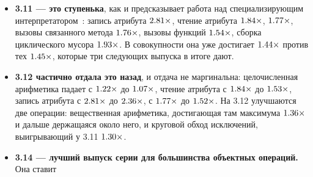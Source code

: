 \begin{itemize}[leftmargin=1.4em,itemsep=1pt]
  \item \textbf{3.11 --- это ступенька}, как и предсказывает работа над специализирующим
        интерпретатором~\cite{pep659}: запись атрибута $\meas{ratio:b3_runtime-v310:attr_set/v310|b3_runtime-v311:attr_set/v311}{2.81}\times$, чтение атрибута $\meas{ratio:b3_runtime-v310:attr_get/v310|b3_runtime-v311:attr_get/v311}{1.84}\times$,
         $\meas{ratio:b3_runtime-v310:list_append/v310|b3_runtime-v311:list_append/v311}{1.77}\times$, вызовы связанного метода $\meas{ratio:b3_runtime-v310:method_call/v310|b3_runtime-v311:method_call/v311}{1.76}\times$, вызовы функций
        $\meas{ratio:b3_runtime-v310:func_call/v310|b3_runtime-v311:func_call/v311}{1.54}\times$, сборка циклического мусора $\meas{ratio:b3_runtime-v310:gc_collect_100k_cycles/v310|b3_runtime-v311:gc_collect_100k_cycles/v311}{1.93}\times$. В совокупности она уже достигает
        $\meas{geomean:b3_runtime-v310|b3_runtime-v311}{1.44}\times$ против тех $\meas{geomean:b3_runtime-v310|b3_runtime-v314}{1.45}\times$, которые три следующих выпуска в итоге дают.
  \item \textbf{3.12 частично отдала это назад}, и отдача не маргинальна: целочисленная арифметика
        падает с $\meas{ratio:b3_runtime-v310:int_arith/v310|b3_runtime-v311:int_arith/v311}{1.22}\times$ до $\meas{ratio:b3_runtime-v310:int_arith/v310|b3_runtime-v312:int_arith/v312}{1.07}\times$, чтение атрибута с $\meas{ratio:b3_runtime-v310:attr_get/v310|b3_runtime-v311:attr_get/v311}{1.84}\times$ до $\meas{ratio:b3_runtime-v310:attr_get/v310|b3_runtime-v312:attr_get/v312}{1.53}\times$,
        запись атрибута с $\meas{ratio:b3_runtime-v310:attr_set/v310|b3_runtime-v311:attr_set/v311}{2.81}\times$ до $\meas{ratio:b3_runtime-v310:attr_set/v310|b3_runtime-v312:attr_set/v312}{2.36}\times$,  с $\meas{ratio:b3_runtime-v310:list_append/v310|b3_runtime-v311:list_append/v311}{1.77}\times$ до
        $\meas{ratio:b3_runtime-v310:list_append/v310|b3_runtime-v312:list_append/v312}{1.52}\times$. На 3.12 улучшаются две операции: вещественная
        арифметика, достигающая там максимума $\meas{ratio:b3_runtime-v310:float_arith/v310|b3_runtime-v312:float_arith/v312}{1.36}\times$ и дальше держащаяся около него, и
        круговой обход исключений, выигрывающий у 3.11 $\meas{ratio:b3_runtime-v311:exception_roundtrip/v311|b3_runtime-v312:exception_roundtrip/v312}{1.30}\times$.
  \item \textbf{3.14 --- лучший выпуск серии для большинства объектных операций.} Она ставит

\end{itemize}
